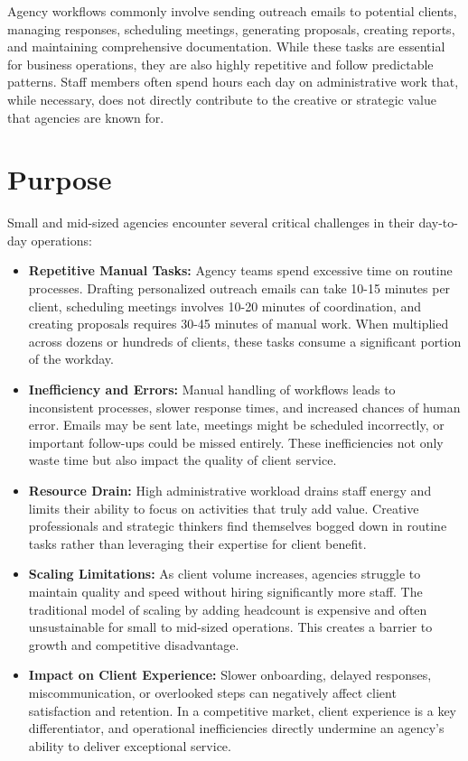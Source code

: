 \documentclass[12pt,a4paper]{report}
\begin{document}
Agency workflows commonly involve sending outreach emails to potential clients, managing responses, scheduling meetings, generating proposals, creating reports, and maintaining comprehensive documentation. While these tasks are essential for business operations, they are also highly repetitive and follow predictable patterns. Staff members often spend hours each day on administrative work that, while necessary, does not directly contribute to the creative or strategic value that agencies are known for.

\section{Purpose}
Small and mid-sized agencies encounter several critical challenges in their day-to-day operations:

\begin{itemize}
    \item \textbf{Repetitive Manual Tasks:} Agency teams spend excessive time on routine processes. Drafting personalized outreach emails can take 10-15 minutes per client, scheduling meetings involves 10-20 minutes of coordination, and creating proposals requires 30-45 minutes of manual work. When multiplied across dozens or hundreds of clients, these tasks consume a significant portion of the workday.
    \item \textbf{Inefficiency and Errors:} Manual handling of workflows leads to inconsistent processes, slower response times, and increased chances of human error. Emails may be sent late, meetings might be scheduled incorrectly, or important follow-ups could be missed entirely. These inefficiencies not only waste time but also impact the quality of client service.
    \item \textbf{Resource Drain:} High administrative workload drains staff energy and limits their ability to focus on activities that truly add value. Creative professionals and strategic thinkers find themselves bogged down in routine tasks rather than leveraging their expertise for client benefit.
    \item \textbf{Scaling Limitations:} As client volume increases, agencies struggle to maintain quality and speed without hiring significantly more staff. The traditional model of scaling by adding headcount is expensive and often unsustainable for small to mid-sized operations. This creates a barrier to growth and competitive disadvantage.
    \item \textbf{Impact on Client Experience:} Slower onboarding, delayed responses, miscommunication, or overlooked steps can negatively affect client satisfaction and retention. In a competitive market, client experience is a key differentiator, and operational inefficiencies directly undermine an agency's ability to deliver exceptional service.
\end{itemize}
\end{document}
